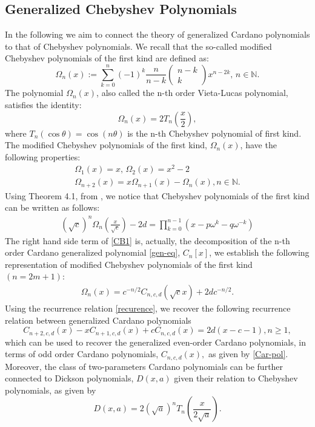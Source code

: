 \documentclass[11pt,reqno]{amsart}
\begin{document}
  
\subsection{Generalized Chebyshev Polynomials}\label{s:2.1}
In the following we aim to connect the theory of generalized Cardano polynomials to that of Chebyshev polynomials.
We recall that the so-called modified Chebyshev polynomials of the first kind are defined as:
\begin{equation}\label{def-Cb}
    \Omega_n(x):=\sum\limits_{k=0}^n(-1)^k \frac{n}{n-k}\begin{pmatrix}
        n-k\\k
    \end{pmatrix}x^{n-2k},\, n\in \mathbb{N}.
\end{equation}
The polynomial $\Omega_n(x)$, also called the n-th order Vieta-Lucas polynomial\cite{Witula2007}, satisfies the identity:
\begin{equation}
    \Omega_n(x)=2T_n(\frac{x}{2}),
\end{equation}
where $T_n(\cos \theta)=\cos (n \theta)$ is the n-th Chebyshev polynomial of first kind.
The modified Chebyshev polynomials of the first kind, $\Omega_n(x)$, have the following properties:
\begin{eqnarray}\label{recurence}
    \Omega_1(x)=x,\,  \Omega_2(x)=x^2-2 \nonumber \\
    \Omega_{n+2}(x) = x\Omega_{n+1}(x)-\Omega_n(x),  n\in\mathbb{N}. 
\end{eqnarray}
Using Theorem 4.1, from \cite{Witula2010}, we notice that Chebyshev polynomials of the first kind can be written as follows:
\begin{eqnarray}\label{CB1}
    (\sqrt{c})^n\Omega_n(\frac{x}{\sqrt{c}})-2d=\prod\limits_{k=0}
    ^{n-1}(x-p\omega^k-q\omega^{-k})
\end{eqnarray}
The right hand side term of \eqref{CB1} is, actually, the decomposition of the n-th order Cardano generalized polynomial \eqref{gen-eq}, $C_n[x]$, we establish the following representation of modified Chebyshev polynomials of the first kind $(n=2m+1)$:
\begin{eqnarray}
    \Omega_n(x)=c^{-n/2}C_{n,c,d}(\sqrt{c}x)+2dc^{-n/2}.
\end{eqnarray}
Using the recurrence relation \eqref{recurence}, we recover the following recurrence relation between generalized Cardano polynomials
\begin{equation}
    C_{{n+2},c,d}(x)-xC_{{n+1},c,d}(x)+cC_{n,c,d}(x)=2d(x-c-1), n\geq 1,
\end{equation}
which can be used to recover the generalized even-order Cardano polynomials, in terms of odd order Cardano polynomials, $C_{n,c,d}(x),$ as given by \eqref{Car-pol}.
Moreover, the class of two-parameters Cardano polynomials can be further connected to Dickson polynomials\cite{Dickson1897}, $D(x,a)$ given their relation to Chebyshev polynomials, as given by  $$D(x,a)=2(\sqrt{a})^nT_n(\frac{x}{2\sqrt{a}}).$$
\end{document}
